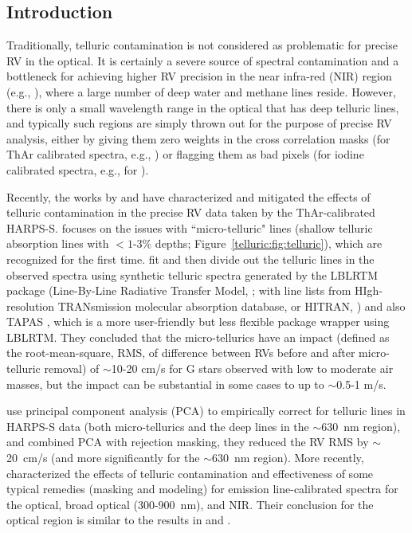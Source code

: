 \subsection{Introduction}\label{keck:telluric:intro}

Traditionally, telluric contamination is not considered as problematic
for precise RV in the optical. It is certainly a severe source of
spectral contamination and a bottleneck for achieving higher RV
precision in the near infra-red (NIR) region (e.g.,
\citealt{2010ApJ...713..410B}), where a large number of deep water and
methane lines reside. However, there is only a small wavelength
range in the optical that has deep telluric lines, and typically such
regions are simply thrown out for the purpose of precise RV analysis,
either by giving them zero weights in the cross correlation masks (for
ThAr calibrated spectra, e.g., \citealt{2002A&A...388..632P}) or
flagging them as bad pixels (for iodine calibrated spectra, e.g., for
\keck).

Recently, the works by \cite{artigau2014} and \cite{cunha2014} have
characterized and mitigated the effects of telluric contamination in
the precise RV data taken by the ThAr-calibrated HARPS-S.
\cite{cunha2014} focuses on the issues with ``micro-telluric" lines
(shallow telluric absorption lines with $<1$-3\% depths;
Figure~\ref{telluric:fig:telluric}), which are recognized for the
first time. \cite{cunha2014} fit and then divide out the telluric
lines in the observed spectra using synthetic telluric spectra
generated by the LBLRTM package (Line-By-Line Radiative Transfer
Model, \citealt{lblrtm}; with line lists from HIgh-resolution
TRANsmission molecular absorption database, or HITRAN,
\citealt{hitran2013}) and also TAPAS \citep{tapas}, which is a more
user-friendly but less flexible package wrapper using LBLRTM. They
concluded that the micro-tellurics have an impact (defined as the
root-mean-square, RMS, of difference between RVs before and after
micro-telluric removal) of $\sim$10-20 cm/s for G stars observed with
low to moderate air masses, but the impact can be substantial in some
cases to up to $\sim$0.5-1 m/s.

\cite{artigau2014} use principal component analysis (PCA) to
empirically correct for telluric lines in HARPS-S data (both
micro-tellurics and the deep lines in the $\sim$630~nm region), and
combined PCA with rejection masking, they reduced the RV RMS by
$\sim$20~cm/s (and more significantly for the $\sim$630~nm
region). More recently, \cite{2016AAS...22713719S} characterized the
effects of telluric contamination and effectiveness of some typical
remedies (masking and modeling) for emission line-calibrated spectra
for the optical, broad optical (300-900~nm), and NIR. Their conclusion
for the optical region is similar to the results in \cite{artigau2014}
and \cite{cunha2014}.

